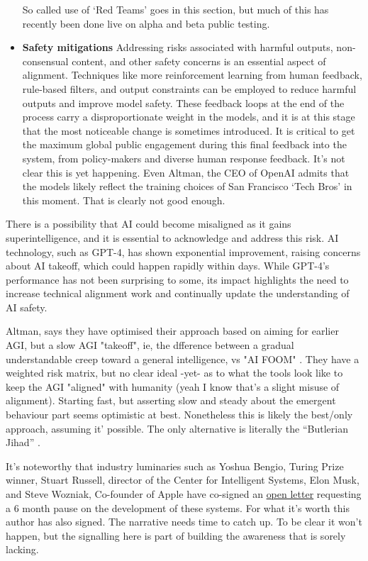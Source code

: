 \begin{itemize}
So called use of `Red Teams' goes in this section, but much of this has recently been done live on alpha and beta public testing. 
\item \textbf{Safety mitigations} Addressing risks associated with harmful outputs, non-consensual content, and other safety concerns is an essential aspect of alignment. Techniques like more reinforcement learning from human feedback, rule-based filters, and output constraints can be employed to reduce harmful outputs and improve model safety. These feedback loops at the end of the process carry a disproportionate weight in the models, and it is at this stage that the most noticeable change is sometimes introduced. It is critical to get the maximum global public engagement during this final feedback into the system, from policy-makers and diverse human response feedback. It's not clear this is yet happening. Even Altman, the CEO of OpenAI admits that the models likely reflect the training choices of San Francisco `Tech Bros' in this moment. That is clearly not good enough.
\end{itemize}
There is a possibility that AI could become misaligned as it gains superintelligence, and it is essential to acknowledge and address this risk. 
AI technology, such as GPT-4, has shown exponential improvement, raising concerns about AI takeoff, which could happen rapidly within days. While GPT-4's performance has not been surprising to some, its impact highlights the need to increase technical alignment work and continually update the understanding of AI safety.\par
Altman, says they have optimised their approach based on aiming for earlier AGI, but a slow AGI "takeoff", ie, the dfference between a gradual understandable creep toward a general intelligence, vs "AI FOOM" \cite{yudkowsky2008hanson}. They have a weighted risk matrix, but no clear ideal -yet- as to what the tools look like to keep the AGI "aligned" with humanity (yeah I know that's a slight misuse of alignment). Starting fast, but asserting slow and steady about the emergent behaviour part seems optimistic at best. Nonetheless this is likely the best/only approach, assuming it' possible. The only alternative is literally the ``Butlerian Jihad'' \cite{song2018preventing}.\par
It's noteworthy that industry luminaries such as Yoshua Bengio, Turing Prize winner, Stuart Russell, director of the Center for Intelligent Systems, Elon Musk, and Steve Wozniak, Co-founder of Apple have co-signed an \href{https://futureoflife.org/open-letter/pause-giant-ai-experiments/}{open letter} requesting a 6 month pause on the development of these systems. For what it's worth this author has also signed. The narrative needs time to catch up. To be clear it won't happen, but the signalling here is part of building the awareness that is sorely lacking. 
